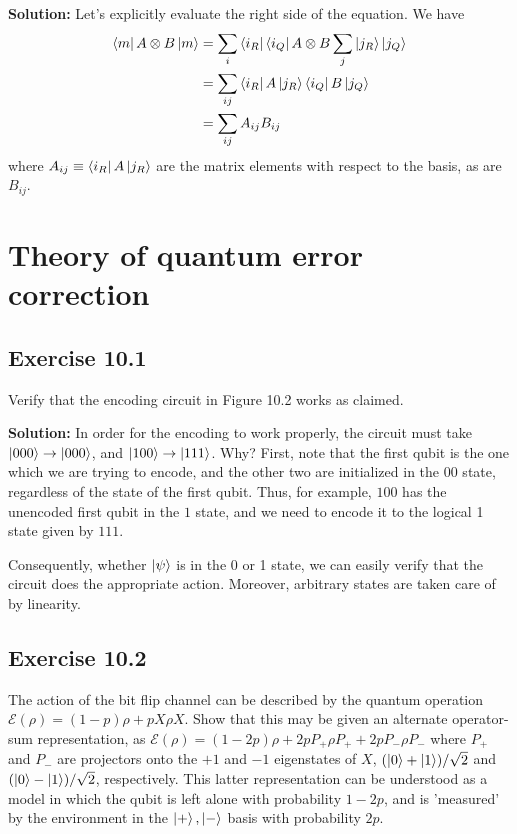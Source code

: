 \documentclass{book}
\newcommand{\mc}[1]{\mathcal{#1}}
\begin{document}
    \textbf{Solution:} Let's explicitly evaluate the right side of the equation. We have
    \begin{align}
    \begin{aligned}
        \bra{m} A \otimes B \ket{m} &= \sum_{i} \bra{i_R}\bra{i_Q} A \otimes B \sum_j \ket{j_R}\ket{j_Q} \\
        &= \sum_{ij} \bra{i_R}A\ket{j_R} \bra{i_Q}B\ket{j_Q} \\
        &= \sum_{ij} A_{ij} B_{ij} 
    \end{aligned}
    \end{align}
    where $A_{ij} \equiv \bra{i_R}A\ket{j_R}$ are the matrix elements with respect to the basis, as are $B_{ij}$. 

\chapter{Theory of quantum error correction}

\section*{Exercise 10.1}
    Verify that the encoding circuit in Figure 10.2 works as claimed.
    
    \textbf{Solution:} In order for the encoding to work properly, the circuit must take $\ket{000} \rightarrow \ket{000}$, and $\ket{100} \rightarrow \ket{111}$. Why? First, note that the first qubit is the one which we are trying to encode, and the other two are initialized in the $00$ state, regardless of the state of the first qubit. Thus, for example, $100$ has the unencoded first qubit in the $1$ state, and we need to encode it to the logical 1 state given by $111$. 
    
    Consequently, whether $\ket{\psi}$ is in the 0 or 1 state, we can easily verify that the circuit does the appropriate action. Moreover, arbitrary states are taken care of by linearity. 

\section*{Exercise 10.2}
    The action of the bit flip channel can be described by the quantum operation $\mc{E}(\rho) = (1-p)\rho + p X\rho X$. Show that this may be given an alternate operator-sum representation, as $\mc{E}(\rho) = (1-2p)\rho + 2p P_+ \rho P_+ + 2p P_- \rho P_-$ where $P_+$ and $P_-$ are projectors onto the $+1$ and $-1$ eigenstates of $X$, $(\ket{0}+\ket{1})/\sqrt{2}$ and $(\ket{0}-\ket{1})/\sqrt{2}$, respectively. This latter representation can be understood as a model in which the qubit is left alone with probability $1-2p$, and is 'measured' by the environment in the $\ket{+}, \ket{-}$ basis with probability $2p$.
    
\end{document}
